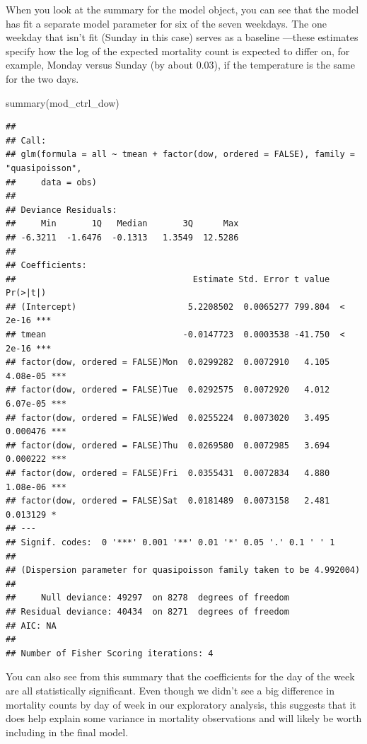\documentclass[
]{book}
\newenvironment{Shaded}{\begin{snugshade}}{\end{snugshade}}
\newcommand{\FunctionTok}[1]{\textcolor[rgb]{0.00,0.00,0.00}{#1}}
\newcommand{\NormalTok}[1]{#1}
\begin{document}
When you look at the summary for the model object, you can see that the
model has fit a separate model parameter for six of the seven weekdays. The one
weekday that isn't fit (Sunday in this case) serves as a baseline ---these
estimates specify how the log of the expected mortality count is expected to
differ on, for example, Monday versus Sunday (by about 0.03), if the temperature
is the same for the two days.

\begin{Shaded}
\begin{Highlighting}[]
\FunctionTok{summary}\NormalTok{(mod\_ctrl\_dow)}
\end{Highlighting}
\end{Shaded}

\begin{verbatim}
## 
## Call:
## glm(formula = all ~ tmean + factor(dow, ordered = FALSE), family = "quasipoisson", 
##     data = obs)
## 
## Deviance Residuals: 
##     Min       1Q   Median       3Q      Max  
## -6.3211  -1.6476  -0.1313   1.3549  12.5286  
## 
## Coefficients:
##                                   Estimate Std. Error t value Pr(>|t|)    
## (Intercept)                      5.2208502  0.0065277 799.804  < 2e-16 ***
## tmean                           -0.0147723  0.0003538 -41.750  < 2e-16 ***
## factor(dow, ordered = FALSE)Mon  0.0299282  0.0072910   4.105 4.08e-05 ***
## factor(dow, ordered = FALSE)Tue  0.0292575  0.0072920   4.012 6.07e-05 ***
## factor(dow, ordered = FALSE)Wed  0.0255224  0.0073020   3.495 0.000476 ***
## factor(dow, ordered = FALSE)Thu  0.0269580  0.0072985   3.694 0.000222 ***
## factor(dow, ordered = FALSE)Fri  0.0355431  0.0072834   4.880 1.08e-06 ***
## factor(dow, ordered = FALSE)Sat  0.0181489  0.0073158   2.481 0.013129 *  
## ---
## Signif. codes:  0 '***' 0.001 '**' 0.01 '*' 0.05 '.' 0.1 ' ' 1
## 
## (Dispersion parameter for quasipoisson family taken to be 4.992004)
## 
##     Null deviance: 49297  on 8278  degrees of freedom
## Residual deviance: 40434  on 8271  degrees of freedom
## AIC: NA
## 
## Number of Fisher Scoring iterations: 4
\end{verbatim}

You can also see from this summary that the coefficients for the day of the
week are all statistically significant. Even though we didn't see a big
difference in mortality counts by day of week in our exploratory analysis,
this suggests that it does help explain some variance in mortality observations
and will likely be worth including in the final model.
\end{document}
